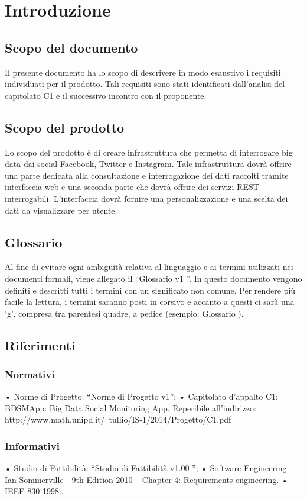 
\section{Introduzione}

\subsection{Scopo del documento}
Il presente documento ha lo scopo di descrivere in modo esaustivo i requisiti individuati per il prodotto. Tali requisiti sono stati identificati dall’analisi del capitolato C1 e il successivo incontro con il proponente.

\subsection{Scopo del prodotto}
Lo scopo del prodotto è di creare infrastruttura che permetta di interrogare big data dai social Facebook, Twitter e Instagram. Tale infrastruttura dovrà offrire una parte dedicata alla consultazione e interrogazione dei dati raccolti tramite interfaccia web e una seconda parte che dovrà offrire dei servizi REST interrogabili. L'interfaccia dovrà fornire una personalizzazione e una scelta dei dati da visualizzare per utente.

\subsection{Glossario}
Al fine di evitare ogni ambiguità relativa al linguaggio e ai termini utilizzati nei documenti formali, viene allegato il “Glossario v1 ”. In questo documento vengono definiti e descritti tutti i termini con un significato non comune. Per rendere più facile la lettura, i termini saranno posti in corsivo e accanto a questi ci sarà una ‘g’, compresa tra
parentesi quadre, a pedice (esempio: Glossario \ped{[g]}).

\subsection{Riferimenti}
\subsubsection{Normativi}
• Norme di Progetto: “Norme di Progetto v1”;
• Capitolato d’appalto C1: BDSMApp: Big Data Social Monitoring App. Reperibile
all’indirizzo: http://www.math.unipd.it/~tullio/IS-1/2014/Progetto/C1.pdf

\subsubsection{Informativi}
• Studio di Fattibilità: “Studio di Fattibilità v1.00 ”;
• Software Engineering - Ian Sommerville - 9th Edition 2010
– Chapter 4: Requirements engineering.
• IEEE 830-1998:.